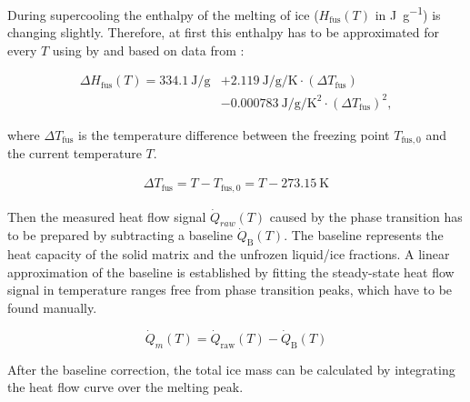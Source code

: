 During supercooling the enthalpy of the melting of ice ($H_\text{fus}(T)$ in \unit{\joule\per\gram}) is changing slightly.
Therefore, at first this enthalpy has to be approximated for every $T$ using  by \textcite{chen.1988} and \textcite{ishikiriyama.1995} based on data from \textcite{randall.1930}:

\begin{equation}
	\begin{aligned}
		\Delta H_\text{fus}(T) = \qty{334.1}{\joule\per\gram} & + \qty{2.119}{\joule\per\gram\per\kelvin} \cdot ( \Delta T_\text{fus} ) \\
		& - \qty{0.000783}{\joule\per\gram\per\kelvin\squared} \cdot ( \Delta T_\text{fus} )^2 ,
	\end{aligned}
	\label{eq:ltdsc_h}
\end{equation}

where $\Delta T_\text{fus}$ is the temperature difference between the freezing point $T_{\text{fus},0}$ and the current temperature $T$.

\begin{equation}
	\begin{aligned}
	\Delta T_\text{fus} = T - T_{\text{fus},0} = T - \qty{273.15}{\kelvin}
	\end{aligned}
\end{equation}

Then the measured heat flow signal $\dot{Q}_{raw}(T)$ caused by the phase transition has to be prepared by subtracting a baseline $\dot{Q}_\text{B}(T)$.
The baseline represents the heat capacity of the solid matrix and the unfrozen liquid/ice fractions.
A linear approximation of the baseline is established by fitting the steady-state heat flow signal in temperature ranges free from phase transition peaks, which have to be found manually.

\begin{equation}
	\dot{Q}_{m}(T) = \dot{Q}_\text{raw}(T) -\dot{Q}_\text{B}(T)
	\label{eq:mass_heat_flow}
\end{equation}


After the baseline correction, the total ice mass can be calculated by integrating the heat flow curve over the melting peak.

